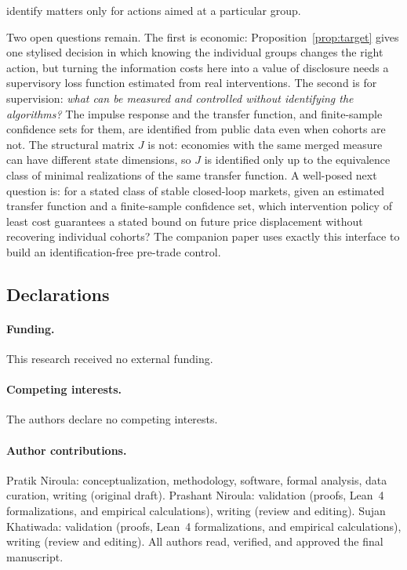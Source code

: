\documentclass[12pt]{article}
\theoremstyle{definition}
\theoremstyle{remark}
\begin{document}
identify matters only for actions aimed at a particular group.

Two open questions remain. The first is economic: Proposition~\ref{prop:target} gives one stylised decision in which knowing the individual groups changes the right action, but turning the information costs here into a value of disclosure needs a supervisory loss function estimated from real interventions. The second is for supervision: \emph{what can be measured and controlled without identifying the algorithms?} The impulse response and the transfer function, and finite-sample confidence sets for them, are identified from public data even when cohorts are not. The structural matrix $J$ is not: economies with the same merged measure can have different state dimensions, so $J$ is identified only up to the equivalence class of minimal realizations of the same transfer function. A well-posed next question is: for a stated class of stable closed-loop markets, given an estimated transfer function and a finite-sample confidence set, which intervention policy of least cost guarantees a stated bound on future price displacement without recovering individual cohorts? The companion paper uses exactly this interface to build an identification-free pre-trade control.

\subsection*{Declarations}

\paragraph{Funding.} This research received no external funding.

\paragraph{Competing interests.} The authors declare no competing interests.

\paragraph{Author contributions.} Pratik Niroula: conceptualization, methodology, software, formal analysis, data curation, writing (original draft). Prashant Niroula: validation (proofs, Lean~4 formalizations, and empirical calculations), writing (review and editing). Sujan Khatiwada: validation (proofs, Lean~4 formalizations, and empirical calculations), writing (review and editing). All authors read, verified, and approved the final manuscript.
\end{document}
